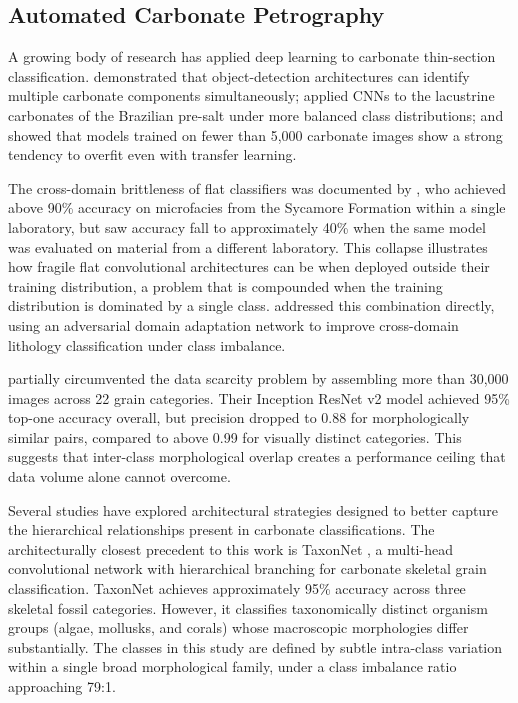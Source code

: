 \documentclass[a4paper,fleqn]{cas-dc}
\begin{document}
\subsection{Automated Carbonate Petrography}
\label{sec:lit_taxonnet}

A growing body of research has applied deep learning to carbonate thin-section classification. \citet{dong2025carbonate} demonstrated that object-detection architectures can identify multiple carbonate components simultaneously; \citet{basso2025presalt} applied CNNs to the lacustrine carbonates of the Brazilian pre-salt under more balanced class distributions; and \citet{dawson2023dataset} showed that models trained on fewer than 5,000 carbonate images show a strong tendency to overfit even with transfer learning.%

The cross-domain brittleness of flat classifiers was documented by \citet{pireslima2020}, who achieved above 90\% accuracy on microfacies from the Sycamore Formation within a single laboratory, but saw accuracy fall to approximately 40\% when the same model was evaluated on material from a different laboratory. This collapse illustrates how fragile flat convolutional architectures can be when deployed outside their training distribution, a problem that is compounded when the training distribution is dominated by a single class. \citet{xie2025} addressed this combination directly, using an adversarial domain adaptation network to improve cross-domain lithology classification under class imbalance.

\citet{liu2020} partially circumvented the data scarcity problem by assembling more than 30,000 images across 22 grain categories. Their Inception ResNet v2 model achieved 95\% top-one accuracy overall, but precision dropped to 0.88 for morphologically similar pairs, compared to above 0.99 for visually distinct categories. This suggests that inter-class morphological overlap creates a performance ceiling that data volume alone cannot overcome.

Several studies have explored architectural strategies designed to better capture the hierarchical relationships present in carbonate classifications. The architecturally closest precedent to this work is TaxonNet \citep{ho2023}, a multi-head convolutional network with hierarchical branching for carbonate skeletal grain classification. TaxonNet achieves approximately 95\% accuracy across three skeletal fossil categories. However, it classifies taxonomically distinct organism groups (algae, mollusks, and corals) whose macroscopic morphologies differ substantially. The classes in this study are defined by subtle intra-class variation within a single broad morphological family, under a class imbalance ratio approaching 79:1.
\end{document}
